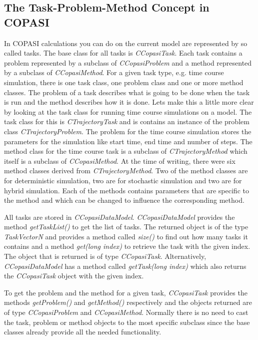 \documentclass[a4,10pt]{article}
\begin{document}
\subsection{The Task-Problem-Method Concept in COPASI}
In COPASI calculations you can do on the current model are represented by so called tasks. The base class for all tasks is \textit{CCopasiTask}. Each task contains a problem represented by a subclass of \textit{CCopasiProblem} and a method represented by a subclass of \textit{CCopasiMethod}.
For a given task type, e.g. time course simulation, there is one task class, one problem class and one or more method classes. The problem of a task describes what is going to be done when the task is run and the method describes how it is done.
Lets make this a little more clear by looking at the task class for running time course simulations on a model. The task class for this is \textit{CTrajectoryTask} and is contains an instance of the problem class \textit{CTrajectoryProblem}. The problem for the time course simulation stores the parameters for the simulation like start time, end time and number of steps. The method class for the time course task is a subclass of \textit{CTrajectoryMethod} which itself is a subclass of \textit{CCopasiMethod}. At the time of writing, there were six method classes derived from \textit{CTrajectoryMethod}. Two of the method classes are for deterministic simulation, two are for stochastic simulation and two are for hybrid simulation. Each of the methods contains parameters that are specific to the method and which can be changed to influence the corresponding method.

All tasks are stored in \textit{CCopasiDataModel}. \textit{CCopasiDataModel} provides the method \textit{getTaskList()} to get the list of tasks. The returned object is of the type \textit{TaskVectorN} and provides a method called \textit{size()} to find out how many tasks it contains and a method \textit{get(long index)} to retrieve the task with the given index. The object that is returned is of type \textit{CCopasiTask}. Alternatively, \textit{CCopasiDataModel} has a method called \textit{getTask(long index)} which also returns the \textit{CCopasiTask} object with the given index.

To get the problem and the method for a given task, \textit{CCopasiTask} provides the methods \textit{getProblem()} and \textit{getMethod()} respectively and the objects returned are of type \textit{CCopasiProblem} and \textit{CCopasiMethod}. Normally there is no need to cast the task, problem or method objects to the most specific subclass since the base classes already provide all the needed functionality.
\end{document}
